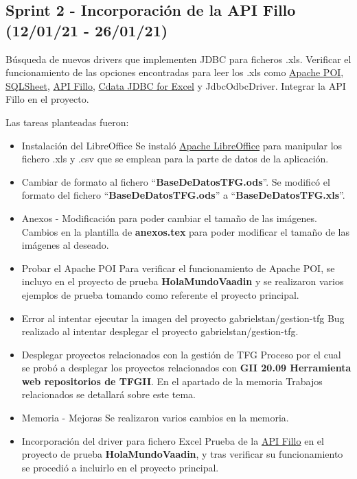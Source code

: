 
\subsection{Sprint 2 - Incorporación de la API Fillo (12/01/21 - 26/01/21)}
Búsqueda de nuevos drivers que implementen JDBC para ficheros .xls. Verificar el funcionamiento de las opciones encontradas para leer los .xls como \href{https://poi.apache.org/}{Apache POI}, \href{https://code.google.com/archive/p/sqlsheet/}{SQLSheet}, \href{https://codoid.com/fillo/}{API Fillo}, \href{https://www.cdata.com/drivers/excel/jdbc/}{Cdata JDBC for Excel} y JdbcOdbcDriver. Integrar la API Fillo en el proyecto. 

Las tareas planteadas fueron:
\begin{itemize}
	\tightlist
	\item Instalación del LibreOffice 
		Se instaló \href{https://es.libreoffice.org/}{Apache LibreOffice} para manipular los fichero .xls y .csv que se emplean para la parte de datos de la aplicación.
	\item Cambiar de formato al fichero ``\textbf{BaseDeDatosTFG.ods}''.
		Se modificó el formato del fichero ``\textbf{BaseDeDatosTFG.ods}'' a ``\textbf{BaseDeDatosTFG.xls}''.
	\item Anexos - Modificación para poder cambiar el tamaño de las imágenes.
		Cambios en la plantilla de \textbf{anexos.tex} para poder modificar el tamaño de las imágenes al deseado.
	\item Probar el Apache POI
		Para verificar el funcionamiento de Apache POI, se incluyo en el proyecto de prueba \textbf{HolaMundoVaadin} y se realizaron varios ejemplos de prueba tomando como referente el proyecto principal.
	\item Error al intentar ejecutar la imagen del proyecto gabrielstan/gestion-tfg
		Bug realizado al intentar desplegar el proyecto  gabrielstan/gestion-tfg.  
	\item Desplegar proyectos relacionados con la gestión de TFG
		Proceso por el cual se probó a desplegar los proyectos relacionados con \textbf{GII 20.09 Herramienta web repositorios de TFGII}. En el apartado de la memoria Trabajos relacionados se detallará sobre este tema. 
	\item Memoria - Mejoras
		Se realizaron varios cambios en la memoria.
	\item Incorporación del driver para fichero Excel
		Prueba de la \href{https://codoid.com/fillo/}{API Fillo} en el proyecto de prueba \textbf{HolaMundoVaadin}, y tras verificar su funcionamiento se procedió a incluirlo en el proyecto principal.

\end{itemize}
